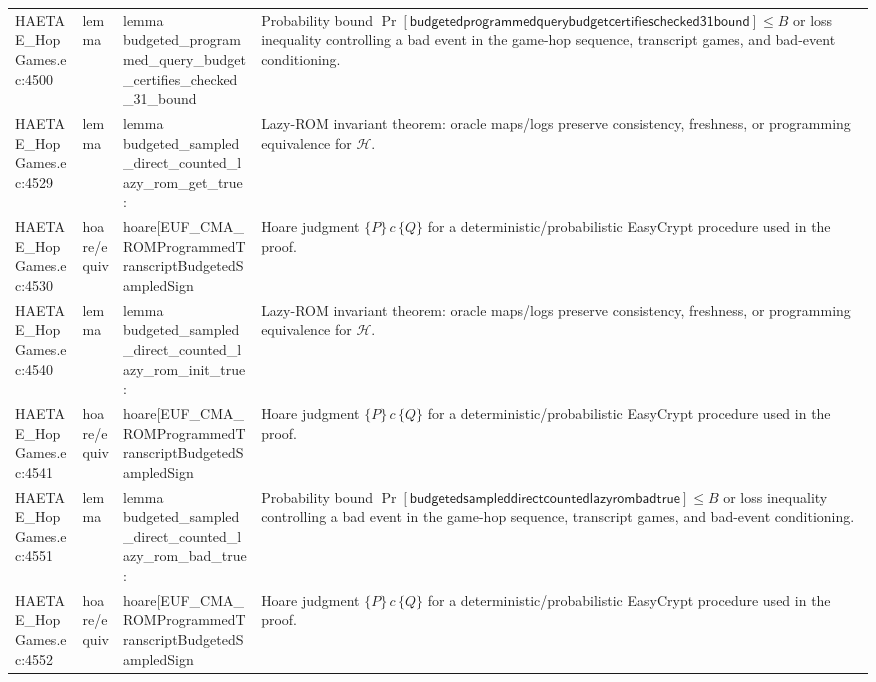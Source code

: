 \documentclass[10pt]{article}
\begin{document}
\begin{longtable}{L{0.11\textwidth}L{0.055\textwidth}L{0.385\textwidth}L{0.41\textwidth}}
HAETAE\_\allowbreak{}HopGames.\allowbreak{}ec:\allowbreak{}4500 & lemma & {\ttfamily\scriptsize lemma budgeted\_\allowbreak{}programmed\_\allowbreak{}query\_\allowbreak{}budget\_\allowbreak{}certifies\_\allowbreak{}checked\_\allowbreak{}31\_\allowbreak{}bound} & Probability bound $\Pr[\mathsf{budgetedprogrammedquerybudgetcertifieschecked31bound}]\le B$ or loss inequality controlling a bad event in the game-hop sequence, transcript games, and bad-event conditioning. \\
HAETAE\_\allowbreak{}HopGames.\allowbreak{}ec:\allowbreak{}4529 & lemma & {\ttfamily\scriptsize lemma budgeted\_\allowbreak{}sampled\_\allowbreak{}direct\_\allowbreak{}counted\_\allowbreak{}lazy\_\allowbreak{}rom\_\allowbreak{}get\_\allowbreak{}true :} & Lazy-ROM invariant theorem: oracle maps/logs preserve consistency, freshness, or programming equivalence for $\mathcal H$. \\
HAETAE\_\allowbreak{}HopGames.\allowbreak{}ec:\allowbreak{}4530 & hoare/equiv & {\ttfamily\scriptsize hoare[EUF\_\allowbreak{}CMA\_\allowbreak{}ROMProgrammedTranscriptBudgetedSampledSign} & Hoare judgment $\{P\}\,c\,\{Q\}$ for a deterministic/probabilistic EasyCrypt procedure used in the proof. \\
HAETAE\_\allowbreak{}HopGames.\allowbreak{}ec:\allowbreak{}4540 & lemma & {\ttfamily\scriptsize lemma budgeted\_\allowbreak{}sampled\_\allowbreak{}direct\_\allowbreak{}counted\_\allowbreak{}lazy\_\allowbreak{}rom\_\allowbreak{}init\_\allowbreak{}true :} & Lazy-ROM invariant theorem: oracle maps/logs preserve consistency, freshness, or programming equivalence for $\mathcal H$. \\
HAETAE\_\allowbreak{}HopGames.\allowbreak{}ec:\allowbreak{}4541 & hoare/equiv & {\ttfamily\scriptsize hoare[EUF\_\allowbreak{}CMA\_\allowbreak{}ROMProgrammedTranscriptBudgetedSampledSign} & Hoare judgment $\{P\}\,c\,\{Q\}$ for a deterministic/probabilistic EasyCrypt procedure used in the proof. \\
HAETAE\_\allowbreak{}HopGames.\allowbreak{}ec:\allowbreak{}4551 & lemma & {\ttfamily\scriptsize lemma budgeted\_\allowbreak{}sampled\_\allowbreak{}direct\_\allowbreak{}counted\_\allowbreak{}lazy\_\allowbreak{}rom\_\allowbreak{}bad\_\allowbreak{}true :} & Probability bound $\Pr[\mathsf{budgetedsampleddirectcountedlazyrombadtrue}]\le B$ or loss inequality controlling a bad event in the game-hop sequence, transcript games, and bad-event conditioning. \\
HAETAE\_\allowbreak{}HopGames.\allowbreak{}ec:\allowbreak{}4552 & hoare/equiv & {\ttfamily\scriptsize hoare[EUF\_\allowbreak{}CMA\_\allowbreak{}ROMProgrammedTranscriptBudgetedSampledSign} & Hoare judgment $\{P\}\,c\,\{Q\}$ for a deterministic/probabilistic EasyCrypt procedure used in the proof. \\

\end{longtable}
\end{document}
